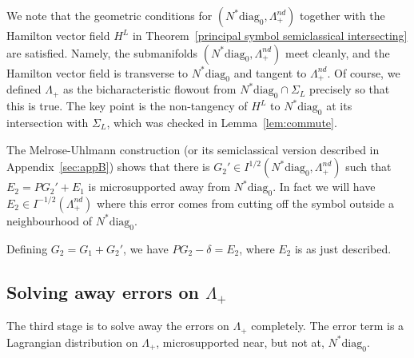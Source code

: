 \documentclass[10pt, a4paper, twoside]{amsart}
\numberwithin{equation}{section}
\theoremstyle{remark}
\begin{document}
We note that the geometric conditions for $(N^* {\mathrm{diag}_0}, \Lambda_+^{nd})$ together with the Hamilton vector field $H^L$ in Theorem~\ref{principal symbol semiclassical intersecting} are satisfied. Namely, the submanifolds $(N^* {\mathrm{diag}_0}, \Lambda_+^{nd})$ meet cleanly, and the Hamilton vector field is transverse to $N^* {\mathrm{diag}_0}$ and tangent to $\Lambda_+^{nd}$. Of course, we defined $\Lambda_+$ as the bicharacteristic flowout from $N^* {\mathrm{diag}_0} \cap \Sigma_L$ precisely so that this is true. The key point is the non-tangency of $H^L$ to $N^* {\mathrm{diag}_0}$ at its intersection with $\Sigma_L$, which was checked in Lemma~\ref{lem:commute}. 

                                                                                                                                                                                                                                                                                                                                                                                                                                                                                                                                                  
The Melrose-Uhlmann construction (or its semiclassical version described in Appendix~\ref{sec:appB}) shows that there is $G_2' \in I^{1/2}(N^* {\mathrm{diag}_0}, \Lambda_+^{nd})$ such that  $E_2 = P G_2' + E_1$ is microsupported away from $N^* {\mathrm{diag}_0}$. In fact we will have $E_2 \in I^{-1/2}(\Lambda_+^{nd})$ where this error comes from cutting off the symbol outside a neighbourhood of $N^* {\mathrm{diag}_0}$. 

Defining $G_2 = G_1 + G_2'$, we have $P G_2 - \delta = E_2$, where $E_2$ is as just described. 

\subsection{Solving away errors on $\Lambda_+$}
The third stage is to solve away the errors on $\Lambda_+$ completely. The error term is a Lagrangian distribution on $\Lambda_+$, microsupported near, but not at,  $N^* {\mathrm{diag}_0}$. 
\end{document}
